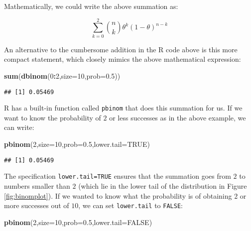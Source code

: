\documentclass[12pt,]{krantz}
\newenvironment{Shaded}{\begin{snugshade}}{\end{snugshade}}
\newcommand{\DataTypeTok}[1]{\textcolor[rgb]{0.13,0.29,0.53}{#1}}
\newcommand{\DecValTok}[1]{\textcolor[rgb]{0.00,0.00,0.81}{#1}}
\newcommand{\FloatTok}[1]{\textcolor[rgb]{0.00,0.00,0.81}{#1}}
\newcommand{\KeywordTok}[1]{\textcolor[rgb]{0.13,0.29,0.53}{\textbf{#1}}}
\newcommand{\NormalTok}[1]{#1}
\newcommand{\OperatorTok}[1]{\textcolor[rgb]{0.81,0.36,0.00}{\textbf{#1}}}
\newcommand{\OtherTok}[1]{\textcolor[rgb]{0.56,0.35,0.01}{#1}}
\begin{document}
Mathematically, we could write the above summation as:

\begin{equation}
\sum_{k=0}^2 \binom{n}{k} \theta^{k} (1-\theta)^{n-k} 
\end{equation}

An alternative to the cumbersome addition in the R code above is this more compact statement, which closely mimics the above mathematical expression:

\begin{Shaded}
\begin{Highlighting}[]
\KeywordTok{sum}\NormalTok{(}\KeywordTok{dbinom}\NormalTok{(}\DecValTok{0}\OperatorTok{:}\DecValTok{2}\NormalTok{,}\DataTypeTok{size=}\DecValTok{10}\NormalTok{,}\DataTypeTok{prob=}\FloatTok{0.5}\NormalTok{))}
\end{Highlighting}
\end{Shaded}

\begin{verbatim}
## [1] 0.05469
\end{verbatim}

R has a built-in function called \texttt{pbinom} that does this summation for us. If we want to know the probability of \(2\) or less successes as in the above example, we can write:

\begin{Shaded}
\begin{Highlighting}[]
\KeywordTok{pbinom}\NormalTok{(}\DecValTok{2}\NormalTok{,}\DataTypeTok{size=}\DecValTok{10}\NormalTok{,}\DataTypeTok{prob=}\FloatTok{0.5}\NormalTok{,}\DataTypeTok{lower.tail=}\OtherTok{TRUE}\NormalTok{)}
\end{Highlighting}
\end{Shaded}

\begin{verbatim}
## [1] 0.05469
\end{verbatim}

The specification \texttt{lower.tail=TRUE} ensures that the summation goes from \(2\) to numbers smaller than \(2\) (which lie in the lower tail of the distribution in Figure \ref{fig:binomplot}). If we wanted to know what the probability is of obtaining \(2\) or more successes out of \(10\), we can set \texttt{lower.tail} to \texttt{FALSE}:

\begin{Shaded}
\begin{Highlighting}[]
\KeywordTok{pbinom}\NormalTok{(}\DecValTok{2}\NormalTok{,}\DataTypeTok{size=}\DecValTok{10}\NormalTok{,}\DataTypeTok{prob=}\FloatTok{0.5}\NormalTok{,}\DataTypeTok{lower.tail=}\OtherTok{FALSE}\NormalTok{)}
\end{Highlighting}
\end{Shaded}
\end{document}
